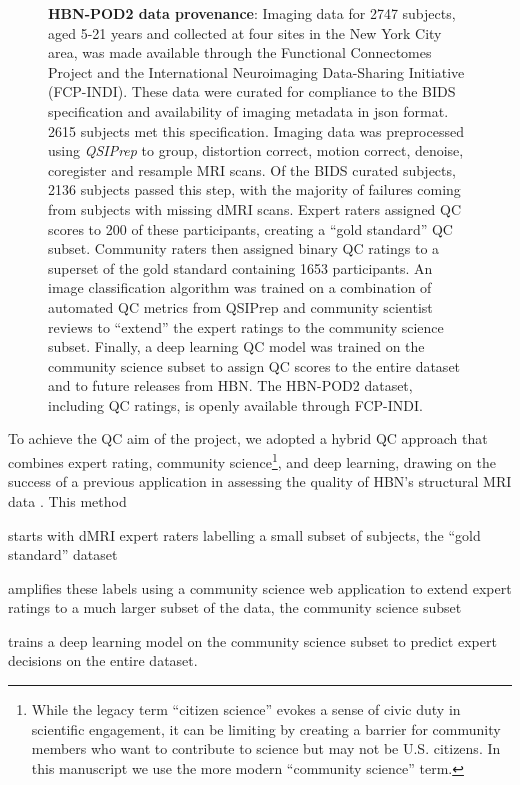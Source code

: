 \documentclass[fleqn,10pt]{wlscirep}
\begin{document}
\begin{figure}[ht]
    \centering
    \caption{%
        {\bf HBN-POD2 data provenance}:
        Imaging data for \num{2747} subjects, aged 5-21 years and collected at four
        sites in the New York City area, was made available through the
        Functional Connectomes Project and the International Neuroimaging
        Data-Sharing Initiative (FCP-INDI).
        These data were curated for compliance to the BIDS specification
        \cite{gorgolewski2016-lh} and availability of imaging metadata in json
        format. \num{2615} subjects met this specification.
        Imaging data was preprocessed using \emph{QSIPrep} \cite{cieslak2021-iq}
        to group, distortion correct, motion correct, denoise, coregister and
        resample MRI scans. Of the BIDS curated subjects, \num{2136} subjects
        passed this step, with the majority of failures coming from subjects
        with missing dMRI scans.
        Expert raters assigned QC scores to \num{200} of these participants,
        creating a ``gold standard'' QC subset. Community raters then assigned
        binary QC ratings to a superset of the gold standard containing
        \num{1653} participants. An image classification algorithm was trained
        on a combination of automated QC metrics from QSIPrep and community
        scientist reviews to ``extend'' the expert ratings to the community
        science subset.  Finally, a deep learning QC model was trained on the
        community science subset to assign QC scores to the entire dataset and
        to future releases from HBN.
        The HBN-POD2 dataset, including QC ratings, is openly available through
        FCP-INDI.
    }
    \label{fig:hbn-sankey}
\end{figure}

To achieve the QC aim of the project, we adopted a hybrid QC approach that
combines expert rating, community science\footnote{%
    While the legacy term ``citizen science'' evokes a sense of civic duty in
    scientific engagement, it can be limiting by creating a barrier for
    community members who want to contribute to science but may not be U.S.
    citizens. In this manuscript we use the more modern ``community science''
    term.
}, and deep learning, drawing on the success of a previous application in
assessing the quality of HBN's structural MRI data \cite{keshavan2019-er}.
This method
\begin{enumerate*}[%
    label=(\roman*),%
    before={{ }},%
    itemjoin={{, }},%
    itemjoin*={{ and }}]
    \item starts with dMRI expert raters labelling a small subset of subjects,
    the ``gold standard'' dataset
    \item amplifies these labels using a community science web application to
    extend expert ratings to a much larger subset of the data, the community
    science subset
    \item trains a deep learning model on the community science subset to
    predict expert decisions on the entire dataset.
\end{enumerate*}
\end{document}
